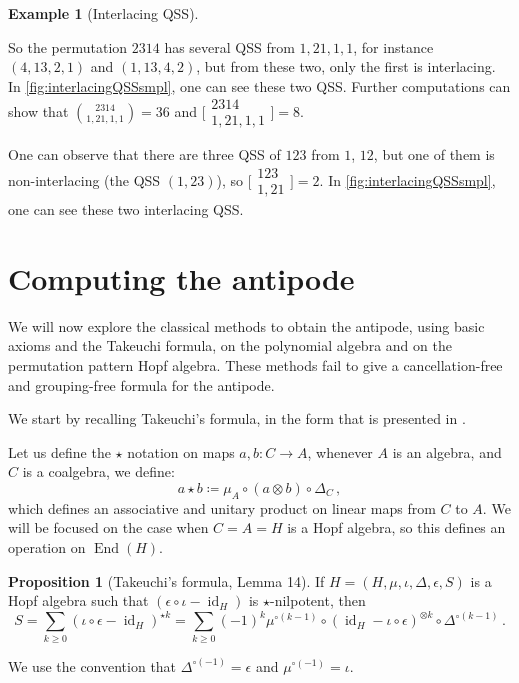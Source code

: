 \documentclass[12pt, reqno]{amsart}
\theoremstyle{definition}
\newtheorem{prop}[thm]{Proposition}
\newtheorem{smpl}[thm]{Example}
\DeclareMathOperator{\id}{id}
\DeclareMathOperator{\End}{\mathrm{End}}
\begin{document}
\begin{smpl}[Interlacing QSS]
\

So the permutation $2314$ has several QSS from $1, 21, 1, 1$, for instance $(4, 13, 2, 1)$ and $(1, 13, 4, 2)$, but from these two, only the first is interlacing.
In \cref{fig:interlacingQSSsmpl}, one can see these two QSS.
Further computations can show that $\binom{2314}{1, 21, 1, 1} = 36$ and $\bigl[\!\begin{smallmatrix} 2314 \\ 1, 21, 1, 1 \end{smallmatrix}\!\bigr] = 8$.

One can observe that there are three QSS of $123$ from $1$, $12$, but one of them is non-interlacing (the QSS $(1,23)$), so
$\bigl[\!\begin{smallmatrix} 123 \\ 1, 21 \end{smallmatrix}\!\bigr] = 2$.
In \cref{fig:interlacingQSSsmpl}, one can see these two interlacing QSS.
\end{smpl}


\section{Computing the antipode\label{sec:antipode_computing}}

We will now explore the classical methods to obtain the antipode, using basic axioms and the Takeuchi formula, on the polynomial algebra and on the permutation pattern Hopf algebra.
These methods fail to give a cancellation-free and grouping-free formula for the antipode.

We start by recalling Takeuchi's formula, in the form that is presented in \cite{GrinbergReiner}.

Let us define the $\star$ notation on maps $a, b: C \to A$, whenever $A$ is an algebra, and $C$ is a coalgebra, we define:
$$a \star b \coloneqq \mu_A \circ (a \otimes b) \circ \Delta_C\, ,$$
which defines an associative and unitary product on linear maps from $C$ to $A$. We will be focused on the case when $C=A=H$ is a Hopf algebra, so this defines an operation on $\End(H)$.

\begin{prop}[Takeuchi's formula, Lemma 14]\label{lm:takeuchi}
If $H = (H, \mu, \iota, \Delta, \epsilon, S)$ is a Hopf algebra such that $(\epsilon\circ \iota - \id_H)$ is $\star$-nilpotent, then 
\begin{equation}\label{eq:eq1}
S = \sum_{k\geq 0 }  ( \iota  \circ\epsilon- \id_H)^{\star k} = \sum_{k\geq 0} (-1)^k \mu^{\circ (k-1)} \circ (\id_{H} - \iota \circ \epsilon)^{\otimes k} \circ \Delta^{\circ (k-1)}\, .
\end{equation}

We use the convention that $\Delta^{\circ (-1)} = \epsilon $ and $\mu^{\circ (-1)} = \iota$.
\end{prop}
\end{document}
